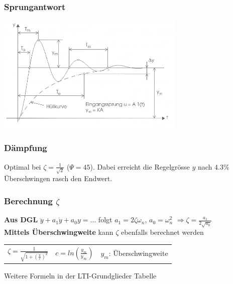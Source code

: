 \subsubsection{Sprungantwort}
\includegraphics[width = 9cm]{./images/pt2StepResp}

\subsubsection{Dämpfung}
Optimal bei $\zeta=\frac{1}{\sqrt{2}}$ ($\Psi=45$).
Dabei erreicht die Regelgrösse $y$ nach $4.3\%$ Überschwingen rasch den	Endwert.

\subsubsection{Berechnung $\zeta$}
\textbf{Aus DGL} $\ddot{y}+a_1\dot{y}+a_0 y=\ldots$ folgt $a_1=2\zeta\omega_n$, 
$a_0=\omega_n^2$
$\Rightarrow \zeta=\frac{a_1}{2\sqrt{a_0}}$ \\
\textbf{Mittels Überschwingweite} kann $\zeta$ ebenfalls berechnet werden\\
\begin{tabular}{p{2.5cm}p{2.5cm}p{4cm}}
$\zeta = \frac{1}{\sqrt{1+(\frac{\pi}{c})^2}}$ & $c =ln(\frac{y_m}{y_{\infty}})$ & $y_m$: Überschwingweite
\end{tabular}

Weitere Formeln in der LTI-Grundglieder Tabelle
